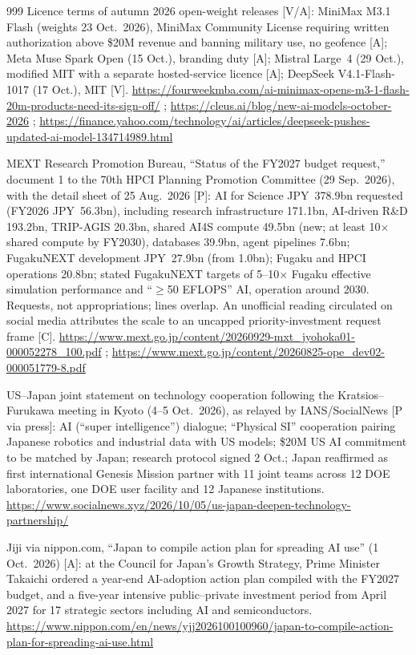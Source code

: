 \begin{thebibliography}{999}
 Licence terms of autumn 2026 open-weight releases [V/A]: MiniMax M3.1 Flash (weights 23 Oct.\ 2026), MiniMax Community License requiring written authorization above \$20M revenue and banning military use, no geofence [A]; Meta Muse Spark Open (15 Oct.), branding duty [A]; Mistral Large~4 (29 Oct.), modified MIT with a separate hosted-service licence [A]; DeepSeek V4.1-Flash-1017 (17 Oct.), MIT [V]. \url{https://fourweekmba.com/ai-minimax-opens-m3-1-flash-20m-products-need-its-sign-off/} ; \url{https://cleus.ai/blog/new-ai-models-october-2026} ; \url{https://finance.yahoo.com/technology/ai/articles/deepseek-pushes-updated-ai-model-134714989.html}

 MEXT Research Promotion Bureau, ``Status of the FY2027 budget request,'' document 1 to the 70th HPCI Planning Promotion Committee (29 Sep.\ 2026), with the detail sheet of 25 Aug.\ 2026 [P]: AI for Science JPY~378.9bn requested (FY2026 JPY~56.3bn), including research infrastructure 171.1bn, AI-driven R\&D 193.2bn, TRIP-AGIS 20.3bn, shared AI4S compute 49.5bn (new; at least 10$\times$ shared compute by FY2030), databases 39.9bn, agent pipelines 7.6bn; FugakuNEXT development JPY~27.9bn (from 1.0bn); Fugaku and HPCI operations 20.8bn; stated FugakuNEXT targets of 5--10$\times$ Fugaku effective simulation performance and ``$\geq$50 EFLOPS'' AI, operation around 2030. Requests, not appropriations; lines overlap. An unofficial reading circulated on social media attributes the scale to an uncapped priority-investment request frame [C]. \url{https://www.mext.go.jp/content/20260929-mxt_jyohoka01-000052278_100.pdf} ; \url{https://www.mext.go.jp/content/20260825-ope_dev02-000051779-8.pdf}

 US--Japan joint statement on technology cooperation following the Kratsios--Furukawa meeting in Kyoto (4--5 Oct.\ 2026), as relayed by IANS/SocialNews [P via press]: AI (``super intelligence'') dialogue; ``Physical SI'' cooperation pairing Japanese robotics and industrial data with US models; \$20M US AI commitment to be matched by Japan; research protocol signed 2 Oct.; Japan reaffirmed as first international Genesis Mission partner with 11 joint teams across 12 DOE laboratories, one DOE user facility and 12 Japanese institutions. \url{https://www.socialnews.xyz/2026/10/05/us-japan-deepen-technology-partnership/}

 Jiji via nippon.com, ``Japan to compile action plan for spreading AI use'' (1 Oct.\ 2026) [A]: at the Council for Japan's Growth Strategy, Prime Minister Takaichi ordered a year-end AI-adoption action plan compiled with the FY2027 budget, and a five-year intensive public--private investment period from April 2027 for 17 strategic sectors including AI and semiconductors. \url{https://www.nippon.com/en/news/yjj2026100100960/japan-to-compile-action-plan-for-spreading-ai-use.html}


\end{thebibliography}
